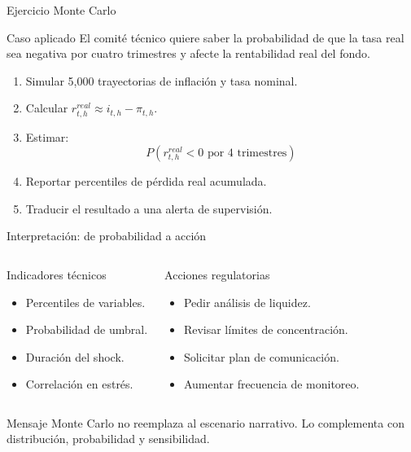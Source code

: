\documentclass[10pt,aspectratio=169]{beamer}
\begin{document}
\begin{frame}{Ejercicio Monte Carlo}
\begin{block}{Caso aplicado}
El comité técnico quiere saber la probabilidad de que la tasa real sea negativa por cuatro trimestres y afecte la rentabilidad real del fondo.
\end{block}

\begin{enumerate}
  \item Simular 5,000 trayectorias de inflación y tasa nominal.
  \item Calcular $r^{real}_{t,h} \approx i_{t,h}-\pi_{t,h}$.
  \item Estimar:
  \[
  P(r^{real}_{t,h}<0 \text{ por 4 trimestres})
  \]
  \item Reportar percentiles de pérdida real acumulada.
  \item Traducir el resultado a una alerta de supervisión.
\end{enumerate}
\end{frame}

\begin{frame}{Interpretación: de probabilidad a acción}
\begin{columns}
\begin{block}{Indicadores técnicos}
\begin{itemize}
  \item Percentiles de variables.
  \item Probabilidad de umbral.
  \item Duración del shock.
  \item Correlación en estrés.
\end{itemize}
\end{block}

\begin{block}{Acciones regulatorias}
\begin{itemize}
  \item Pedir análisis de liquidez.
  \item Revisar límites de concentración.
  \item Solicitar plan de comunicación.
  \item Aumentar frecuencia de monitoreo.
\end{itemize}
\end{block}
\end{columns}

\vspace{0.5em}
\begin{block}{Mensaje}
Monte Carlo no reemplaza al escenario narrativo. Lo complementa con distribución, probabilidad y sensibilidad.
\end{block}
\end{frame}
\end{document}
